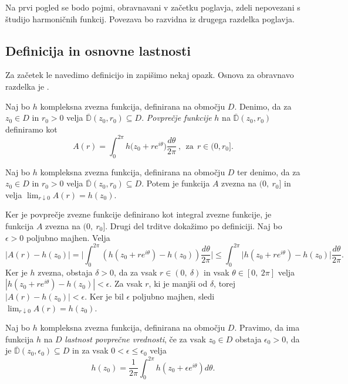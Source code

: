 \documentclass[mat1, tisk]{fmfdelo}
\begin{document}
Na prvi pogled se bodo pojmi, obravnavani v začetku poglavja, zdeli nepovezani s študijo harmoničnih funkcij. Povezava bo razvidna iz drugega razdelka poglavja. 

\subsection{Definicija in osnovne lastnosti}

    Za začetek le navedimo definicijo in zapišimo nekaj opazk. Osnova za obravnavo razdelka je \cite[poglavje 3.4.]{gamelin}.

    \begin{definicija}  
        Naj bo $h$ kompleksna zvezna funkcija, definirana na območju $D$. Denimo, da za $z_0 \in D$ in $r_0 > 0$ velja $\overline{\mathbb{D}}(z_0, r_0) \subseteq D$. \emph{Povprečje funkcije} $h$ na $\overline{\mathbb{D}}(z_0, r_0)$ definiramo kot
        $$
            A(r) = \int_{0}^{2 \pi}{h \big(z_0 + r e^{i\theta}\big)\frac{d\theta}{2 \pi}}~,~~\text{za}~~r \in (0,r_0].
        $$
    \end{definicija}
    \begin{trditev}
        \label{zvpov}
        Naj bo $h$ kompleksna zvezna funkcija, definirana na območju $D$ ter denimo, da za $z_0 \in D$ in $r_0 > 0$ velja $\overline{\mathbb{D}}(z_0, r_0) \subseteq D$. 
        Potem je funkcija $A$ zvezna na $(0,~r_0]$ in velja $\lim_{r \downarrow 0}{A(r)} = h(z_0)$.
    \end{trditev}
    \begin{dokaz}
        Ker je povprečje zvezne funkcije definirano kot integral zvezne funkcije, je funkcija $A$ zvezna na $(0,~r_0]$. Drugi del trditve dokažimo po definiciji.
        Naj bo $\epsilon > 0$ poljubno majhen. Velja
        $$
            |A(r) - h(z_0)| = \bigg|\int_{0}^{2\pi} \left(h(z_0 + r e^{i\theta})  - h(z_0)\right) \frac{d\theta}{2\pi} \bigg| \leq \int_{0}^{2 \pi} \big| h(z_0 + r e^{i\theta}) - h(z_0) \big| \frac{d\theta}{2 \pi}.
        $$
        Ker je $h$ zvezna, obstaja $\delta > 0$, da za vsak $r \in  (0,~\delta)$ in vsak $\theta \in [0,~2\pi]$ velja \mbox{$|h(z_0 + r e^{i\theta}) - h(z_0)| < \epsilon$}.
        Za vsak $r$, ki je manjši od $\delta$, torej $|A(r) - h(z_0)| < \epsilon$. Ker je bil $\epsilon$ poljubno majhen, sledi $\lim_{r \downarrow 0}{A(r)} = h(z_0)$.
    \end{dokaz}

    \begin{definicija}
        Naj bo $h$ kompleksna zvezna funkcija, definirana na območju $D$. Pravimo, da ima funkcija $h$ na $D$ \emph{lastnost povprečne vrednosti}, če za vsak $z_0 \in D$ obstaja $\epsilon_0 > 0$, da je $\overline{\mathbb{D}}(z_0, \epsilon_0) \subseteq D$ in za vsak $0 < \epsilon \leq \epsilon_0 $ velja
        $$
            h(z_0) = \frac{1}{2 \pi} \int_{0}^{2 \pi}{h(z_0 + \epsilon e^{i \theta}) d\theta}.
        $$
    \end{definicija}
\end{document}
